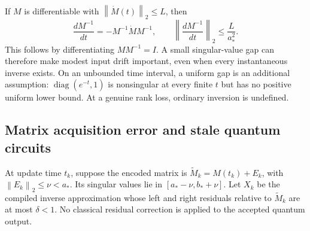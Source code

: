 \documentclass[journal]{IEEEtran}
\newcommand{\norm}[1]{\left\lVert#1\right\rVert}
\begin{document}
If $M$ is differentiable with $\norm{\dot M(t)}_2\leq L$, then
\begin{equation}
 \frac{d M^{-1}}{dt}=-M^{-1}\dot M M^{-1},\qquad
 \left\lVert\frac{d M^{-1}}{dt}\right\rVert_2\leq\frac{L}{a_*^2}.
 \label{eq:inversevariation}
\end{equation}
This follows by differentiating $MM^{-1}=I$. A small singular-value gap
can therefore make modest input drift important, even when every
instantaneous inverse exists. On an unbounded time interval, a uniform
gap is an additional assumption: $\operatorname{diag}(e^{-t},1)$ is
nonsingular at every finite $t$ but has no positive uniform lower bound.
At a genuine rank loss, ordinary inversion is undefined.

\subsection{Matrix acquisition error and stale quantum circuits}
At update time $t_k$, suppose the encoded matrix is
$\widetilde M_k=M(t_k)+E_k$, with $\norm{E_k}_2\leq\nu<a_*$.
Its singular values lie in $[a_*-\nu,b_*+\nu]$. Let $X_k$ be the
compiled inverse approximation whose left and right residuals relative
to $\widetilde M_k$ are at most $\delta<1$. No classical residual
correction is applied to the accepted quantum output.
\end{document}
